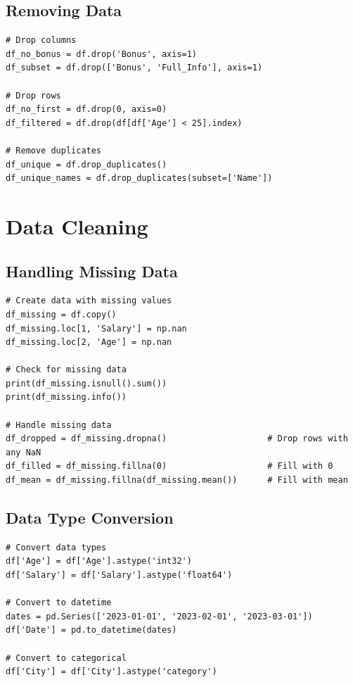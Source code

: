 \documentclass[12pt,a4paper]{article}
\begin{document}
\subsection{Removing Data}

\begin{lstlisting}
# Drop columns
df_no_bonus = df.drop('Bonus', axis=1)
df_subset = df.drop(['Bonus', 'Full_Info'], axis=1)

# Drop rows
df_no_first = df.drop(0, axis=0)
df_filtered = df.drop(df[df['Age'] < 25].index)

# Remove duplicates
df_unique = df.drop_duplicates()
df_unique_names = df.drop_duplicates(subset=['Name'])
\end{lstlisting}

\section{Data Cleaning}

\subsection{Handling Missing Data}

\begin{lstlisting}
# Create data with missing values
df_missing = df.copy()
df_missing.loc[1, 'Salary'] = np.nan
df_missing.loc[2, 'Age'] = np.nan

# Check for missing data
print(df_missing.isnull().sum())
print(df_missing.info())

# Handle missing data
df_dropped = df_missing.dropna()                    # Drop rows with any NaN
df_filled = df_missing.fillna(0)                    # Fill with 0
df_mean = df_missing.fillna(df_missing.mean())      # Fill with mean
\end{lstlisting}

\subsection{Data Type Conversion}

\begin{lstlisting}
# Convert data types
df['Age'] = df['Age'].astype('int32')
df['Salary'] = df['Salary'].astype('float64')

# Convert to datetime
dates = pd.Series(['2023-01-01', '2023-02-01', '2023-03-01'])
df['Date'] = pd.to_datetime(dates)

# Convert to categorical
df['City'] = df['City'].astype('category')
\end{lstlisting}
\end{document}
